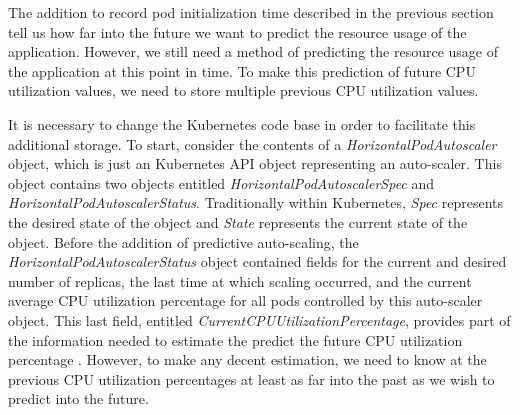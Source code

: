 The addition to record pod initialization time described in the
previous section tell us how far into the future
we want to predict the resource usage of the application. However, we still need
a method of predicting the resource usage of the application at this point in
time. To make this prediction of future CPU utilization values,
we need to store multiple previous CPU utilization values.

It is necessary to change the Kubernetes code base in order
to facilitate this additional storage. To start,
consider the contents of a \textit{HorizontalPodAutoscaler} object, which is
just an Kubernetes API object representing an auto-scaler. This object contains
two objects entitled \textit{HorizontalPodAutoscalerSpec} and
\textit{HorizontalPodAutoscalerStatus}. Traditionally within
Kubernetes, \textit{Spec} represents the desired state of the object and
\textit{State} represents the current state of the object. Before the addition
of predictive auto-scaling, the \textit{HorizontalPodAutoscalerStatus} object
contained fields for the current and desired number of replicas, the last time
at which scaling occurred, and the current average CPU utilization percentage for
all pods controlled by this auto-scaler object. This last field, entitled
\textit{CurrentCPUUtilizationPercentage}, provides part of the information
needed to estimate the predict the future CPU utilization
percentage \cite{k8s-horizontal-pod-autoscaler-object}.
However, to make any decent estimation, we need to know at the previous CPU
utilization percentages at least as far into the past as we wish to predict into
the future.

